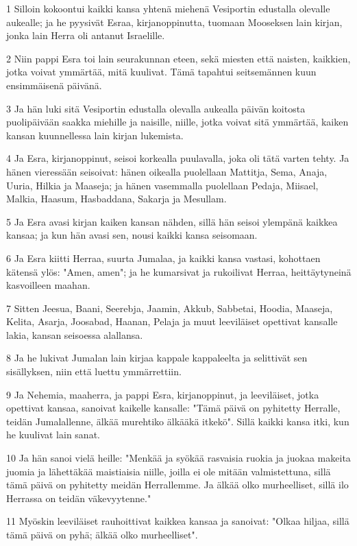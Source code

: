 \par 1 Silloin kokoontui kaikki kansa yhtenä miehenä Vesiportin edustalla olevalle aukealle; ja he pyysivät Esraa, kirjanoppinutta, tuomaan Mooseksen lain kirjan, jonka lain Herra oli antanut Israelille.
\par 2 Niin pappi Esra toi lain seurakunnan eteen, sekä miesten että naisten, kaikkien, jotka voivat ymmärtää, mitä kuulivat. Tämä tapahtui seitsemännen kuun ensimmäisenä päivänä.
\par 3 Ja hän luki sitä Vesiportin edustalla olevalla aukealla päivän koitosta puolipäivään saakka miehille ja naisille, niille, jotka voivat sitä ymmärtää, kaiken kansan kuunnellessa lain kirjan lukemista.
\par 4 Ja Esra, kirjanoppinut, seisoi korkealla puulavalla, joka oli tätä varten tehty. Ja hänen vieressään seisoivat: hänen oikealla puolellaan Mattitja, Sema, Anaja, Uuria, Hilkia ja Maaseja; ja hänen vasemmalla puolellaan Pedaja, Miisael, Malkia, Haasum, Hasbaddana, Sakarja ja Mesullam.
\par 5 Ja Esra avasi kirjan kaiken kansan nähden, sillä hän seisoi ylempänä kaikkea kansaa; ja kun hän avasi sen, nousi kaikki kansa seisomaan.
\par 6 Ja Esra kiitti Herraa, suurta Jumalaa, ja kaikki kansa vastasi, kohottaen kätensä ylös: "Amen, amen"; ja he kumarsivat ja rukoilivat Herraa, heittäytyneinä kasvoilleen maahan.
\par 7 Sitten Jeesua, Baani, Seerebja, Jaamin, Akkub, Sabbetai, Hoodia, Maaseja, Kelita, Asarja, Joosabad, Haanan, Pelaja ja muut leeviläiset opettivat kansalle lakia, kansan seisoessa alallansa.
\par 8 Ja he lukivat Jumalan lain kirjaa kappale kappaleelta ja selittivät sen sisällyksen, niin että luettu ymmärrettiin.
\par 9 Ja Nehemia, maaherra, ja pappi Esra, kirjanoppinut, ja leeviläiset, jotka opettivat kansaa, sanoivat kaikelle kansalle: "Tämä päivä on pyhitetty Herralle, teidän Jumalallenne, älkää murehtiko älkääkä itkekö". Sillä kaikki kansa itki, kun he kuulivat lain sanat.
\par 10 Ja hän sanoi vielä heille: "Menkää ja syökää rasvaisia ruokia ja juokaa makeita juomia ja lähettäkää maistiaisia niille, joilla ei ole mitään valmistettuna, sillä tämä päivä on pyhitetty meidän Herrallemme. Ja älkää olko murheelliset, sillä ilo Herrassa on teidän väkevyytenne."
\par 11 Myöskin leeviläiset rauhoittivat kaikkea kansaa ja sanoivat: "Olkaa hiljaa, sillä tämä päivä on pyhä; älkää olko murheelliset".

